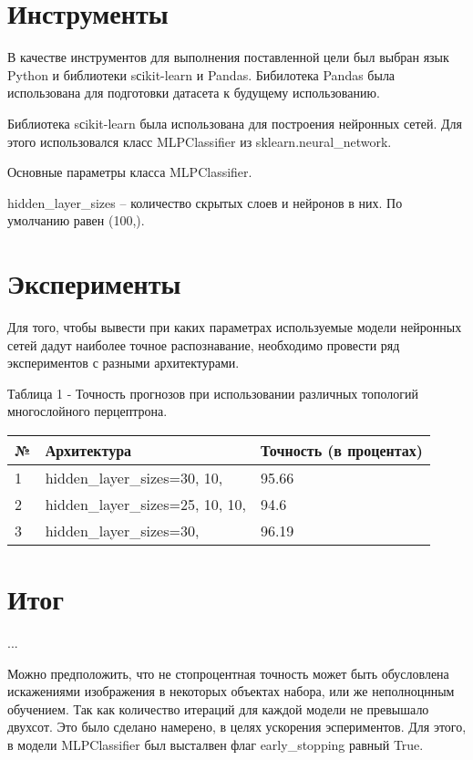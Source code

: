 \documentclass[a4paper,12pt]{article}
\begin{document}
	
\newpage\section{Инструменты} 
	В качестве инструментов для выполнения поставленной цели был выбран язык Python и библиотеки sсikit-learn и Pandas.
	Бибилотека Pandas была использована для подготовки датасета к будущему использованию.
	
	\vspace{0.5cm}
	Библиотека sсikit-learn была использована для построения нейронных сетей. Для этого использовался класс MLPClassifier из sklearn.neural\_network.
	
	\vspace{0.5cm}
	Основные параметры класса MLPClassifier.
	
	\vspace{0.5cm}
	hidden\_layer\_sizes – количество скрытых слоев и нейронов в них. По умолчанию равен (100,).

	
\newpage\section{Эксперименты}
	Для того, чтобы вывести при каких параметрах используемые модели нейронных сетей дадут наиболее точное распознавание, необходимо провести ряд экспериментов с разными архитектурами. 

	\vspace{0.5cm}
	Таблица 1 - Точность прогнозов  при использовании различных топологий многослойного перцептрона.
\begin{longtable}{|p{1cm}|p{9cm}|p{3cm}|}
\hline
№ & Архитектура & Точность (в процентах) \\ 
\hline 
1 & hidden\_layer\_sizes=30, 10, & 95.66 \\
\hline
2 & hidden\_layer\_sizes=25, 10, 10,  & 94.6 \\
\hline 
3 & hidden\_layer\_sizes=30, & 96.19 \\
\hline
\end{longtable}


\newpage\section{Итог}
	...
	
	\vspace{0.5cm}
	Можно предположить, что не стопроцентная точность может быть обусловлена искажениями изображения в некоторых объектах  набора, или же неполноцнным обучением. Так как количество итераций для каждой модели не превышало двухсот. Это было сделано намерено, в целях ускорения эспериментов. Для этого, в модели MLPClassifier был высталвен флаг early\_stopping равный True.
	
	
\end{document}
